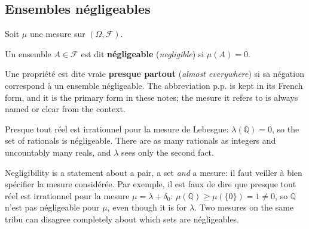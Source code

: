 \subsection{Ensembles négligeables}

Soit $\mu$ une mesure sur $(\Omega,\mathcal{F})$.

\begin{definition}
  Un ensemble $A \in \mathcal{F}$ est dit \textbf{négligeable} (\textit{negligible})
  si $\mu(A) = 0$.
\end{definition}

Une propriété est dite vraie \textbf{presque partout} (\textit{almost everywhere})
si sa négation correspond à un ensemble négligeable. The abbreviation p.p. is kept
in its French form, and it is the primary form in these notes; the mesure it refers
to is always named or clear from the context.

\begin{example}
  Presque tout réel est irrationnel pour la mesure de Lebesgue: $\lambda(\mathbb{Q})
  = 0$, so the set of rationals is négligeable. There are as many rationals as
  integers and uncountably many reals, and $\lambda$ sees only the second fact.
\end{example}

\begin{remark}
  Negligibility is a statement about a pair, a set \emph{and} a mesure: il faut
  veiller à bien spécifier la mesure considérée. Par exemple, il est faux de dire
  que presque tout réel est irrationnel pour la mesure $\mu = \lambda + \delta_{0}$:
  $\mu(\mathbb{Q}) \geq \mu(\{0\}) = 1 \neq 0$, so $\mathbb{Q}$ n'est pas
  négligeable pour $\mu$, even though it is for $\lambda$. Two mesures on the same
  tribu can disagree completely about which sets are négligeables.
\end{remark}

